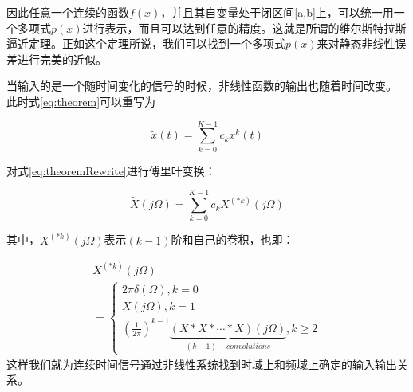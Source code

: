 		因此任意一个连续的函数$f(x)$，并且其自变量处于闭区间[a,b]上，可以统一用一个多项式$p(x)$进行表示，而且可以达到任意的精度。这就是所谓的维尔斯特拉斯逼近定理。正如这个定理所说，我们可以找到一个多项式$p(x)$来对静态非线性误差进行完美的近似。\par
		当输入的是一个随时间变化的信号的时候，非线性函数的输出也随着时间改变。
		此时式\ref{eq:theorem}可以重写为
			
			\begin{equation}
				\tilde x\left( t \right) = \sum\limits_{k = 0}^{K - 1} {{c_k}{x^k}\left( t \right)}  \label{eq:theoremRewrite}
			\end{equation}
			
		对式\ref{eq:theoremRewrite}进行傅里叶变换：
			
			\begin{equation}
				\tilde X\left( {j\Omega } \right) = \sum\limits_{k = 0}^{K - 1} {{c_k}{X^{\left( {*k} \right)}}\left( {j\Omega } \right)} 
			\end{equation}
			
		其中，${X^{\left( {*k} \right)}}\left( {j\Omega } \right)$表示$(k-1)$阶和自己的卷积，也即：
		
			\begin{equation}
				\begin{array}{l}
	{X^{\left( {*k} \right)}}\left( {j\Omega } \right)\\
	 = \left\{ \begin{array}{l}
	2\pi \delta \left( \Omega  \right),k = 0\\
	X\left( {j\Omega } \right),k = 1\\
	{\left( {\frac{1}{{2\pi }}} \right)^{k - 1}}\underbrace {\left( {X*X* \cdots *X} \right)\left( {j\Omega } \right)}_{\left( {k - 1} \right) - convolutions},k \ge 2
	\end{array} \right.
	\end{array}
			\end{equation}
		这样我们就为连续时间信号通过非线性系统找到时域上和频域上确定的输入输出关系。

